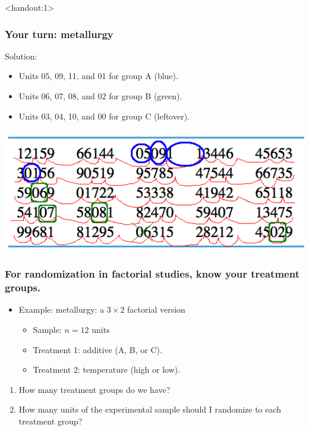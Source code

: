 \documentclass[handout]{beamer}\usepackage{graphicx, color}
\newcommand{\answers}{1}
\numberwithin{equation}{section}
\begin{document}
\begin{frame}<handout:\answers>
\frametitle{Your turn: metallurgy}

Solution:
\begin{itemize}
\item Units 05, 09, 11, and 01 for group A (blue).
\pause \item Units 06, 07, 08, and 02 for group B (green).
\pause \item Units 03, 04, 10, and 00 for group C (leftover).
\end{itemize}


\begin{center}
 \includegraphics{../../fig/rdigitsshortranomize1.png}
\end{center}

\end{frame}



\begin{frame}
\frametitle{For randomization in factorial studies, know your treatment groups.}


\begin{itemize}
\item Example: metallurgy: a $3 \times 2$ factorial version
\begin{itemize}
\pause \item Sample: $n = 12$ units
\pause \item Treatment 1: additive (A, B, or C).
\pause \item Treatment 2: temperature (high or low).
\end{itemize} 
\end{itemize}

\begin{enumerate}[1. ]
\pause \item How many treatment groups do we have?
\pause \item How many units of the experimental sample should I randomize to each treatment group?
\end{enumerate}

\end{frame}
\end{document}
